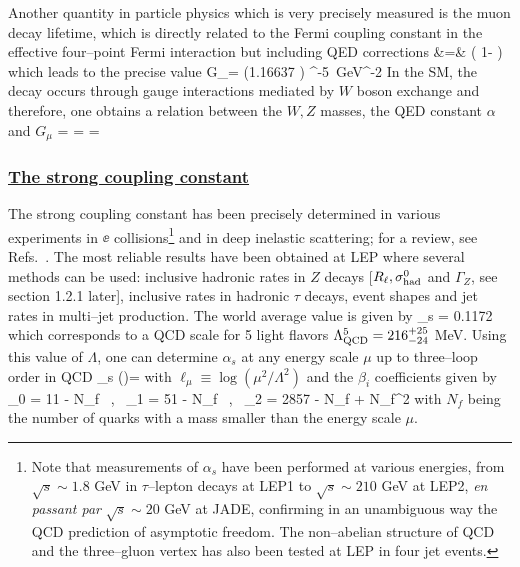 Another quantity in particle physics which is very precisely measured is the 
muon decay lifetime, which is directly related to the Fermi coupling constant 
in the effective four--point Fermi interaction but including QED corrections
\cite{GF-correction}
\beq
{} &=&  
\left( 1-  \right) 
\eeq
which leads to the precise value
\beq
G_\mu = (1.16637 ) ^{-5}~{\rm GeV}^{-2}
 \eeq    
In the SM, the decay occurs through gauge interactions mediated by $W$ boson 
exchange  and therefore, one obtains a relation between the $W,Z$  masses,
the QED constant $\alpha$ and $G_\mu$
\beq
{} =  \cdot {}
\cdot {} =  
=  
\label{def:GF}
\eeq

\subsubsection*{\underline{The strong coupling constant}}

\nn The strong coupling constant has been precisely determined in various
experiments in $\ee$ collisions\footnote{Note that measurements of $\alpha_s$
have been performed at various energies, from $\sqrt s \sim 1.8$ GeV in 
$\tau$--lepton decays at LEP1 to $\sqrt{s} \sim 210$ GeV at LEP2, {\it en 
passant par} $\sqrt{s} \sim 20$ GeV at JADE, confirming in an unambiguous way 
the QCD prediction of asymptotic freedom. The non--abelian structure of QCD and
the three--gluon vertex has also been tested at LEP in four jet events.} and in
deep inelastic scattering; for a review, see Refs.~\cite{alphas-review,PDG}. The most
reliable results have been obtained at LEP where several methods can be used:
inclusive hadronic rates in $Z$ decays [$R_\ell, \sigma^0_{\rm had}$ and 
$\Gamma_Z$, see section 1.2.1 later], inclusive rates in hadronic $\tau$ 
decays, event shapes and jet rates in multi--jet production. The world average 
value is given by \cite{PDG}
\beq
\alpha_s = 0.1172 
\eeq
which corresponds to a QCD scale for 5 light flavors $\Lambda_{\rm QCD}^5=216
^{+25}_{-24}$ MeV.  Using this value of $\Lambda$, one can determine $\alpha_s$
at any energy scale $\mu$ up to three--loop order in QCD \cite{alphas-evol}
\beq
\alpha_s (\mu)= \frac{4 \pi}{\beta_0 \ell_\mu} 
\eeq
with $\ell_\mu \equiv \log (\mu^2/\Lambda^2)$ and the $\beta_i$ coefficients 
given by
\beq
\beta_0 = 11 -  N_f \ , \ 
\beta_1 = 51 -  N_f \ , \ 
\beta_2 = 2857 -  N_f + N_f^2 
\eeq
with $N_f$ being the number of quarks with a mass smaller than the energy 
scale $\mu$. 

